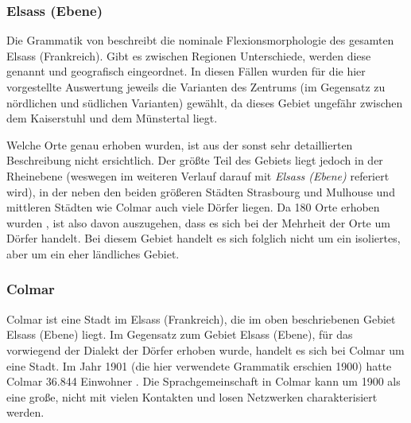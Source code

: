 \subsubsection{Elsass (Ebene)}

Die Grammatik von \citet{Beyer1963} beschreibt die nominale Flexionsmorphologie des gesamten Elsass (Frankreich). Gibt es zwischen Regionen Unterschiede, werden diese genannt und geografisch eingeordnet. In diesen Fällen wurden für die hier vorgestellte Auswertung jeweils die Varianten des Zentrums (im Gegensatz zu nördlichen und südlichen Varianten) gewählt, da dieses Gebiet ungefähr zwischen dem Kaiserstuhl und dem Münstertal liegt.

Welche Orte genau erhoben wurden, ist aus der sonst sehr detaillierten Beschreibung nicht ersichtlich. Der größte Teil des Gebiets liegt jedoch in der Rheinebene (weswegen im weiteren Verlauf darauf mit \textit{Elsass (Ebene)} referiert wird), in der neben den beiden größeren Städten Strasbourg und Mulhouse und mittleren Städten wie Colmar auch viele Dörfer liegen. Da 180 Orte erhoben wurden \citep[15]{Beyer1963}, ist also davon auszugehen, dass es sich bei der Mehrheit der Orte um Dörfer handelt. Bei diesem Gebiet handelt es sich folglich nicht um ein isoliertes, aber um ein eher ländliches Gebiet.

\subsubsection{Colmar}

Colmar ist eine Stadt im Elsass (Frankreich), die im oben beschriebenen Gebiet Elsass (Ebene) liegt. Im Gegensatz zum Gebiet Elsass (Ebene), für das vorwiegend der Dialekt der Dörfer erhoben wurde, handelt es sich bei Colmar um eine Stadt. Im Jahr 1901 (die hier verwendete Grammatik erschien 1900) hatte Colmar 36.844 Einwohner \citep{MotteVouloirSarrabezolles2015}. Die Sprachgemeinschaft in Colmar kann um 1900 als eine große, nicht  mit vielen Kontakten und losen Netzwerken charakterisiert werden.